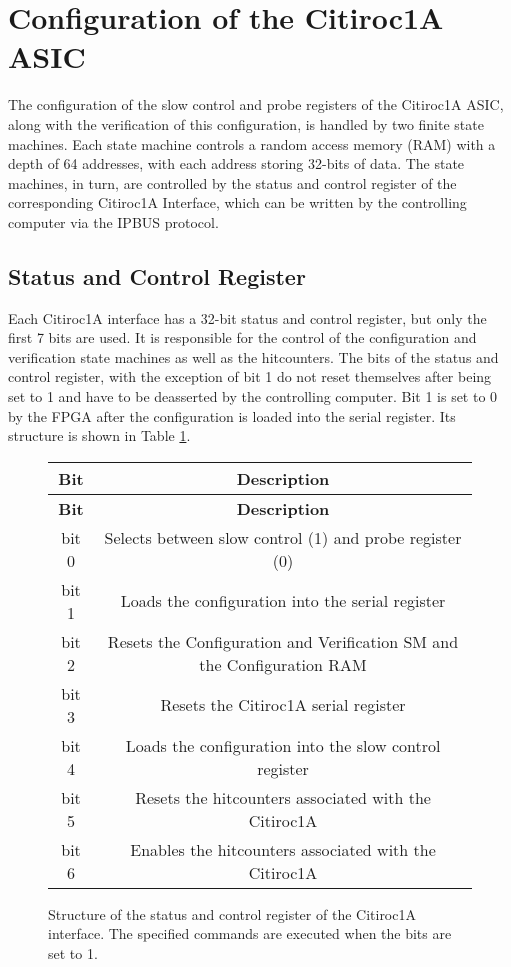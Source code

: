 \section{Configuration of the Citiroc1A ASIC}

The configuration of the slow control and probe registers of the Citiroc1A ASIC,
along with the verification of this configuration, is handled by two finite state machines.
\newline
Each state machine controls a random access memory (RAM) with a depth of 64 addresses,
with each address storing 32-bits of data.
\newline
The state machines, in turn, are controlled by the status and control register of the corresponding Citiroc1A Interface, which can be written by the controlling computer via the IPBUS protocol.
\subsection{Status and Control Register}
Each Citiroc1A interface has a 32-bit status and control register, but only the first 7 bits are used.
It is responsible for the control of the configuration and verification state machines as well as the hitcounters.
The bits of the status and control register, with the exception of bit 1
do not reset themselves after being set to 1 and have to be deasserted by the controlling computer.
\newline
Bit 1 is set to 0 by the FPGA after the configuration is loaded into the serial register.
\newline
Its structure is shown in Table \ref{tab:status_control_register}.
\begin{figure}[H]
    \centering
\begin{longtable}{|c|c|}
    \hline
    \textbf{Bit} & \textbf{Description} \\
    \hline
    \endfirsthead
    
    \hline
    \textbf{Bit} & \textbf{Description} \\
    \hline
    \endhead
    
    \hline
    \endfoot
    
    \hline
    \endlastfoot
    bit 0 & Selects between slow control (1) and probe register (0) \\
    bit 1 & Loads the configuration into the serial register\\
    bit 2 & Resets the Configuration and Verification SM and the Configuration RAM \\
    bit 3 & Resets the  Citiroc1A serial register \\
    bit 4 & Loads the configuration into the slow control register \\
    bit 5 & Resets the hitcounters associated with the Citiroc1A \\
    bit 6 & Enables the hitcounters associated with the Citiroc1A \\
    \hline
    \end{longtable}
    \caption{Structure of the status and control register of the Citiroc1A interface. 
    The specified commands are executed when the bits are set to 1. }  
    \label{tab:status_control_register}
\end{figure}  
  
